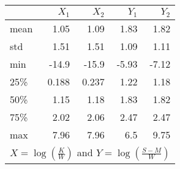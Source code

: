 \begin{tabular}{lrrrr}
\toprule
{} &  $X_1$ &  $X_2$ &  $Y_1$ &  $Y_2$ \\
\midrule
mean &   1.05 &   1.09 &   1.83 &   1.82 \\
std  &   1.51 &   1.51 &   1.09 &   1.11 \\
min  &  -14.9 &  -15.9 &  -5.93 &  -7.12 \\
25\%  &  0.188 &  0.237 &   1.22 &   1.18 \\
50\%  &   1.15 &   1.18 &   1.83 &   1.82 \\
75\%  &   2.02 &   2.06 &   2.47 &   2.47 \\
max  &   7.96 &   7.96 &    6.5 &   9.75 \\
\bottomrule
\multicolumn{5}{l}{{\scriptsize $X = \log\left(\frac{K}{W}\right)$ and $Y=\log\left(\frac{S-M}{W}\right)$}}
\end{tabular}
